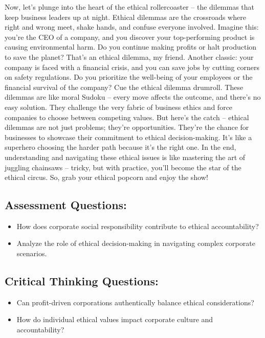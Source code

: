 \documentclass[
  letterpaper,
  DIV=11,
  numbers=noendperiod]{scrreprt}
\begin{document}
Now, let's plunge into the heart of the ethical rollercoaster -- the
dilemmas that keep business leaders up at night. Ethical dilemmas are
the crossroads where right and wrong meet, shake hands, and confuse
everyone involved. Imagine this: you're the CEO of a company, and you
discover your top-performing product is causing environmental harm. Do
you continue making profits or halt production to save the planet?
That's an ethical dilemma, my friend. Another classic: your company is
faced with a financial crisis, and you can save jobs by cutting corners
on safety regulations. Do you prioritize the well-being of your
employees or the financial survival of the company? Cue the ethical
dilemma drumroll. These dilemmas are like moral Sudoku -- every move
affects the outcome, and there's no easy solution. They challenge the
very fabric of business ethics and force companies to choose between
competing values. But here's the catch -- ethical dilemmas are not just
problems; they're opportunities. They're the chance for businesses to
showcase their commitment to ethical decision-making. It's like a
superhero choosing the harder path because it's the right one. In the
end, understanding and navigating these ethical issues is like mastering
the art of juggling chainsaws -- tricky, but with practice, you'll
become the star of the ethical circus. So, grab your ethical popcorn and
enjoy the show!

\subsection{Assessment Questions:}\label{assessment-questions-4}

\begin{itemize}
\item
  How does corporate social responsibility contribute to ethical
  accountability?
\item
  Analyze the role of ethical decision-making in navigating complex
  corporate scenarios.
\end{itemize}

\subsection{Critical Thinking
Questions:}\label{critical-thinking-questions-2}

\begin{itemize}
\item
  Can profit-driven corporations authentically balance ethical
  considerations?
\item
  How do individual ethical values impact corporate culture and
  accountability?
\end{itemize}
\end{document}
